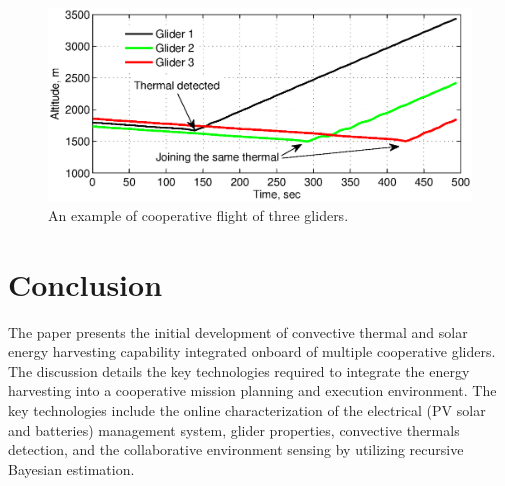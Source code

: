\documentclass{ifacconf}
\begin{document}
\begin{figure}[thpb]
  \centering
  \includegraphics[scale=0.39]{Figures/Coop_gain_altitude.eps}
  \caption{An example of cooperative flight of three gliders.}
  \label{fig:CoopFlightHeight}
\end{figure}


\section{Conclusion}
The paper presents the initial development of  convective thermal
and solar energy harvesting capability integrated onboard of multiple
cooperative gliders. The discussion details the key technologies required to integrate
the energy harvesting into a cooperative mission planning and execution
environment. The key technologies include the online characterization of the
electrical (PV solar and batteries) management system, glider properties,
convective thermals detection, and the collaborative
environment sensing by utilizing recursive Bayesian estimation.
\end{document}

